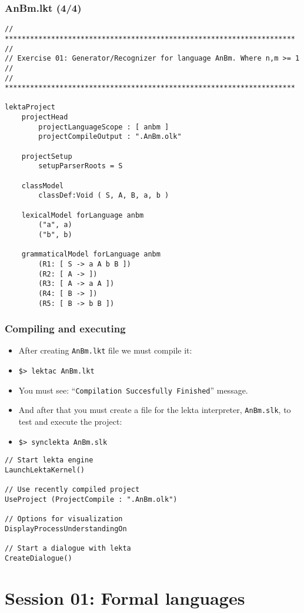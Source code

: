 \documentclass[11pt]{beamer}
\begin{document}
\begin{frame}[fragile]
\frametitle{AnBm.lkt (4/4)}
\tiny
\begin{lstlisting}[language=lekta]
// *********************************************************************
//
// Exercise 01: Generator/Recognizer for language AnBm. Where n,m >= 1
//
// *********************************************************************

lektaProject
	projectHead
		projectLanguageScope : [ anbm ]
		projectCompileOutput : ".AnBm.olk"

	projectSetup
		setupParserRoots = S

	classModel
		classDef:Void ( S, A, B, a, b )

	lexicalModel forLanguage anbm
		("a", a)
		("b", b)

	grammaticalModel forLanguage anbm
		(R1: [ S -> a A b B ])
		(R2: [ A -> ])
		(R3: [ A -> a A ])
		(R4: [ B -> ])
		(R5: [ B -> b B ])
\end{lstlisting}
\end{frame}

\begin{frame}[fragile]
\frametitle{Compiling and executing}
\begin{itemize}
	\item After creating \texttt{AnBm.lkt} file we must compile it:
	\pause
	\item \texttt{\$> lektac AnBm.lkt}
	\pause
	\item You must see: ``\texttt{Compilation Succesfully Finished}'' message.
	\pause
	\item And after that you must create a file for the lekta interpreter, \texttt{AnBm.slk}, to test and execute the project:
	\pause
	\item \texttt{\$> synclekta AnBm.slk}
\end{itemize}
\tiny
\begin{lstlisting}[language=lekta]
// Start lekta engine
LaunchLektaKernel()

// Use recently compiled project
UseProject (ProjectCompile : ".AnBm.olk")

// Options for visualization
DisplayProcessUnderstandingOn

// Start a dialogue with lekta
CreateDialogue()
\end{lstlisting}
\end{frame}

\section{Session 01: Formal languages}
\end{document}
